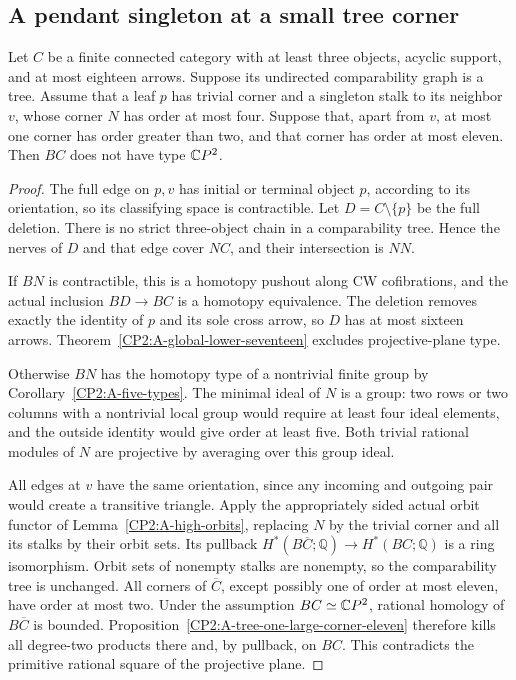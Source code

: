 \subsection{A pendant singleton at a small tree corner}

\begin{proposition}
\label{CP2:A-pendant-small-tree-eighteen}
Let $C$ be a finite connected category with at least three
objects, acyclic support, and at most eighteen arrows.
Suppose its undirected comparability graph is a tree.
Assume that a leaf $p$ has trivial corner and a singleton
stalk to its neighbor $v$, whose corner $N$ has order at
most four. Suppose that, apart from $v$, at most one corner
has order greater than two, and that corner has order at
most eleven. Then $BC$ does not have type $\mathbb{C}P^2$.
\end{proposition}
\begin{proof}
The full edge on $p,v$ has initial or terminal object $p$,
according to its orientation, so its classifying space is
contractible. Let $D=C\setminus\{p\}$ be the full deletion.
There is no strict three-object chain in a comparability
tree. Hence the nerves of $D$ and that edge cover $NC$,
and their intersection is $NN$.

If $BN$ is contractible, this is a homotopy pushout along
CW cofibrations, and the actual inclusion $BD\to BC$ is
a homotopy equivalence. The deletion removes exactly the
identity of $p$ and its sole cross arrow, so $D$ has at
most sixteen arrows. Theorem~\ref{CP2:A-global-lower-seventeen}
excludes projective-plane type.

Otherwise $BN$ has the homotopy type of a nontrivial finite
group by Corollary~\ref{CP2:A-five-types}. The minimal ideal
of $N$ is a group: two rows or two columns with a nontrivial
local group would require at least four ideal elements,
and the outside identity would give order at least five.
Both trivial rational modules of $N$ are projective by
averaging over this group ideal.

All edges at $v$ have the same orientation, since any
incoming and outgoing pair would create a transitive
triangle. Apply the appropriately sided actual orbit
functor of Lemma~\ref{CP2:A-high-orbits}, replacing $N$
by the trivial corner and all its stalks by their orbit
sets. Its pullback
$H^*(B\overline C;\mathbb Q)\to H^*(BC;\mathbb Q)$
is a ring isomorphism. Orbit sets of nonempty stalks
are nonempty, so the comparability tree is unchanged.
All corners of $\overline C$, except possibly one of
order at most eleven, have order at most two. Under the
assumption $BC\simeq\mathbb{C}P^2$, rational homology of
$B\overline C$ is bounded. Proposition~\ref{CP2:A-tree-one-large-corner-eleven}
therefore kills all degree-two products there and, by
pullback, on $BC$. This contradicts the primitive rational
square of the projective plane.
\end{proof}
